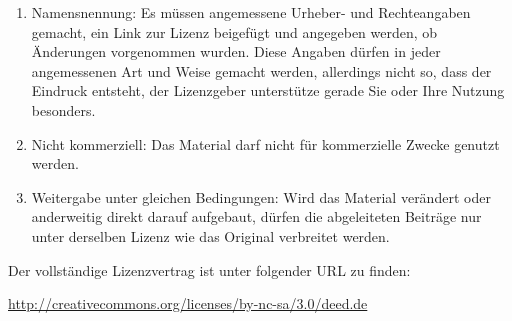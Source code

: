 \documentclass[$font_size]{$document_type}
\begin{document}
{\begin{enumerate}
\item Namensnennung: Es müssen angemessene Urheber- und Rechteangaben gemacht, ein
   Link zur Lizenz beigefügt und angegeben werden, ob Änderungen vorgenommen
   wurden. Diese Angaben dürfen in jeder angemessenen Art und Weise gemacht
   werden, allerdings nicht so, dass der Eindruck entsteht, der Lizenzgeber
   unterstütze gerade Sie oder Ihre Nutzung besonders.

\item  Nicht kommerziell: Das Material darf nicht für kommerzielle Zwecke genutzt
   werden.

\item  Weitergabe unter gleichen Bedingungen: Wird das Material verändert oder
   anderweitig direkt darauf aufgebaut, dürfen die abgeleiteten Beiträge nur
   unter derselben Lizenz wie das Original verbreitet werden.
\end{enumerate}

\noindent
Der vollständige Lizenzvertrag ist unter folgender URL zu finden:

\noindent
{}\url{http://creativecommons.org/licenses/by-nc-sa/3.0/deed.de}
}
\end{document}
